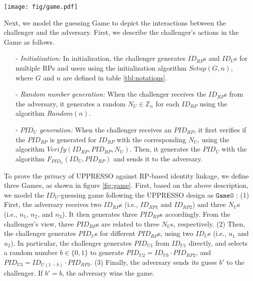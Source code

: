 \vspace{1mm}
\begin{strip}
\centering\texttt{[image: fig/game.pdf]}
\label{fig:game}
\vspace{-5mm}
\end{strip}

Next, we model the guessing Game to depict the interactions between the challenger and the adversary. First, we describe the challenger's actions in the Game as follows.
\begin{itemize}
\vspace{-\topsep}
\item[-] {\em Initialization:} In initialization, the challenger generates $ID_{RP}$s and $ID_U$s for multiple RPs and users using the initialization algorithm $Setup(G,n)$, where $G$ and $n$ are defined in table \ref{tbl:notations}.
\vspace{-\topsep}
\item[-] {\em Random number generation:} When the challenger receives the $ID_{RP}$s from the adversary, it generates a random $N_U \in \mathbb{Z}_n$ for each $ID_{RP}$ using the algorithm $Random(n)$. %
\vspace{-\topsep}
\item[-] {\em $PID_U$ generation:} When the challenger receives an $PID_{RP}$, it first verifies if the $PID_{RP}$ is generated for $ID_{RP}$ with the corresponding $N_U$, using the algorithm $Verify(ID_{RP},PID_{RP},N_U)$. Then, it generates the $PID_U$ with the algorithm $F_{PID_U}(ID_U,PID_{RP})$ and sends it to the adversary.
\end{itemize}

To prove the privacy of UPPRESSO against RP-based identity linkage, we define three Games, as shown in figure \ref{fig:game}. First, based on the above description, we model the $ID_U$-guessing game following the UPPRESSO design as $\mathtt{Game 0}$ : (1) First, the adversary receives two $ID_{RP}$s (i.e., $ID_{RP1}$ and $ID_{RP2}$) and three $N_U$s (i.e., $n_1$, $n_2$, and $n_3$). It then generates three $PID_{RP}$s accordingly. From the challenger's view, three $PID_{RP}$s are related to three $N_U$s, respectively. (2) Then, the challenger generates $PID_U$s for different $PID_{RP}$s, using two $ID_U$s (i.e., $u_1$ and $u_2$). %
In particular, the challenger generates $PID_{U1}$ from $ID_{U1}$ directly, and selects a random number $b \in \{0, 1\}$ to generate $PID_{U2}=ID_{Ub} \cdot PID_{RP2}$, and $PID_{U3}=ID_{U(1-b)} \cdot PID_{RP3}$. (3) Finally, the adversary sends its guess $b'$ to the challenger. If $b'=b$, the adversary wins the game.

